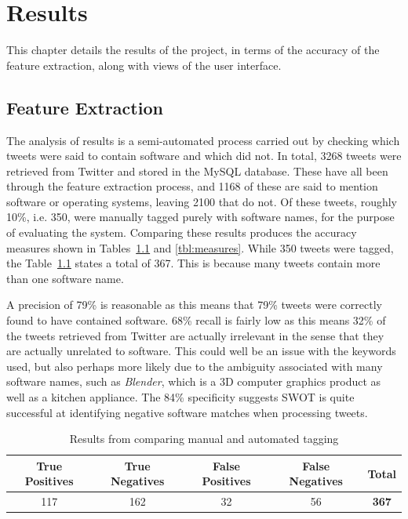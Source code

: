\chapter{Results}
\label{cha:results}
This chapter details the results of the project, in terms of the accuracy of the feature extraction, along with views of the user interface.

\section{Feature Extraction}
The analysis of results is a semi-automated process carried out by checking which tweets were said to contain software and which did not. In total, 3268 tweets were retrieved from Twitter and stored in the MySQL database. These have all been through the feature extraction process, and 1168 of these are said to mention software or operating systems, leaving 2100 that do not. Of these tweets, roughly 10\%, i.e. 350, were manually tagged purely with software names, for the purpose of evaluating the system. Comparing these results produces the accuracy measures shown in Tables~\ref{tbl:truefalse} and \ref{tbl:measures}. While 350 tweets were tagged, the Table~\ref{tbl:truefalse} states a total of 367. This is because many tweets contain more than one software name.

A precision of 79\% is reasonable as this means that 79\% tweets were correctly found to have contained software. 68\% recall is fairly low as this means 32\% of the tweets retrieved from Twitter are actually irrelevant in the sense that they are actually unrelated to software. This could well be an issue with the keywords used, but also perhaps more likely due to the ambiguity associated with many software names, such as \emph{Blender}, which is a 3D computer graphics product as well as a kitchen appliance. The 84\% specificity suggests SWOT is quite successful at identifying negative software matches when processing tweets.

\begin{table}[h]
\begin{center}
\begin{tabular}{|c|c|c|c|c|}\hline
True Positives&True Negatives&False Positives&False Negatives&\textbf{Total}\\\hline
117&162&32&56&\textbf{367}\\\hline
\end{tabular}
\end{center}
\caption{Results from comparing manual and automated tagging}
\label{tbl:truefalse}
\end{table}

